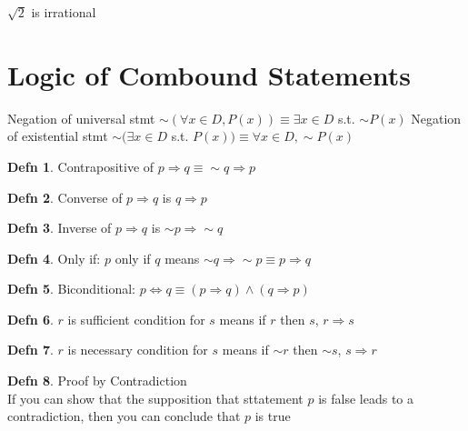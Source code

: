 \documentclass[a4paper]{article}
\theoremstyle{definition}
\newtheorem*{defn}{Defn}
\newenvironment{theorem}[1]
  {\renewcommand\theinnertheorem{#1}\innertheorem}
  {\endinnertheorem}
\begin{document}
\begin{theorem}{4.7.1}
  $\sqrt{2}$ is irrational
\end{theorem}


\section{Logic of Combound Statements}

\begin{theorem}{3.2.1} Negation of universal stmt
  $\sim(\forall x \in D, P(x)) \equiv \exists x \in D$ s.t. $\sim P(x)$
\end{theorem}
\begin{theorem}{3.2.1} Negation of existential stmt
  $\sim(\exists x \in D$ s.t. $P(x)) \equiv \forall x \in D, \sim P(x)$
\end{theorem}

\begin{defn}{Contrapositive}
  of $p \Rightarrow q \equiv \sim q \Rightarrow p$ 
\end{defn}

\begin{defn}{Converse}
  of $p \Rightarrow q$ is $q \Rightarrow p$
\end{defn}
\begin{defn}{Inverse}
  of $p \Rightarrow q$ is $\sim p \Rightarrow \sim q$
\end{defn}

\begin{defn}{Only if:}
  $p$ only if $q$ means $\sim q \Rightarrow \sim p \equiv p \Rightarrow q$
\end{defn}

\begin{defn}{Biconditional:}
  $p \Leftrightarrow q \equiv (p \Rightarrow q) \land (q \Rightarrow p)$
\end{defn}
\begin{defn}
  $r$ is sufficient condition for $s$ means if $r$ then $s$, $r \Rightarrow s$
\end{defn}
\begin{defn}
  $r$ is necessary condition for $s$ means if $\sim r$ then $\sim s$, $s \Rightarrow r$
\end{defn}


\begin{defn}{Proof by Contradiction}\\
  If you can show that the supposition that sttatement $p$ is false leads to a contradiction, then you can conclude that $p$ is true
\end{defn}
\end{document}
